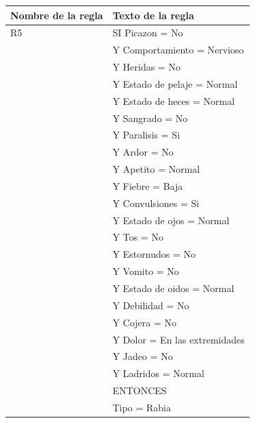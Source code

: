 \documentclass[a4paper,table,xcdraw]{article}
\begin{document}
\begin{table}[H]
\centering
\begin{tabular}{|l|l|}
\hline
\textbf{Nombre de la regla} & Texto de la regla \\ \hline
R5 & SI Picazon = No \\
  & Y Comportamiento = Nervioso \\
  & Y Heridas = No \\
  & Y Estado de pelaje = Normal \\
  & Y Estado de heces = Normal \\
  & Y Sangrado = No \\
  & Y Paralisis = Si \\
  & Y Ardor = No \\
  & Y Apetito = Normal \\
  & Y Fiebre = Baja \\
  & Y Convulsiones = Si \\
  & Y Estado de ojos = Normal \\
  & Y Tos = No \\
  & Y Estornudos = No \\
  & Y Vomito = No \\
  & Y Estado de oidos = Normal \\
  & Y Debilidad = No \\
  & Y Cojera = No \\
  & Y Dolor = En las extremidades \\
  & Y Jadeo = No \\
  & Y Ladridos = Normal \\
  &   ENTONCES \\
  & Tipo = Rabia \\ \hline
\end{tabular}
\end{table}
  
\end{document}
